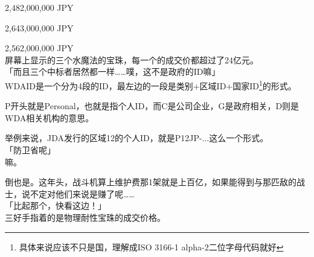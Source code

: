 2,482,000,000 JPY

2,643,000,000 JPY

2,562,000,000 JPY\\

屏幕上显示的三个水魔法的宝珠，每一个的成交价都超过了24亿元。\\

「而且三个中标者居然都一样……噗，这不是政府的ID嘛」\\

WDAID是一个分为4段的ID，最左边的一段是类别+区域ID+国家ID\footnote{具体来说应该不只是国，理解成ISO 3166-1 alpha-2二位字母代码就好}的形式。

P开头就是Personal，也就是指个人ID，而C是公司企业，G是政府相关，D则是WDA相关机构的意思。

举例来说，JDA发行的区域12的个人ID，就是P12JP-...这么一个形式。\\

「防卫省呢」\\

嘛。

倒也是。这年头，战斗机算上维护费那1架就是上百亿，如果能得到与那匹敌的战士，说不定对他们来说是赚了呢……\\

「比起那个，快看这边！」\\

三好手指着的是物理耐性宝珠的成交价格。\\


